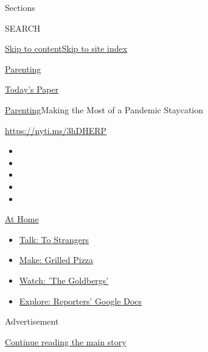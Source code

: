 Sections

SEARCH

\protect\hyperlink{site-content}{Skip to
content}\protect\hyperlink{site-index}{Skip to site index}

\href{https://www.nytimes.com/section/parenting}{Parenting}

\href{https://myaccount.nytimes.com/auth/login?response_type=cookie\&client_id=vi}{}

\href{https://www.nytimes.com/section/todayspaper}{Today's Paper}

\href{/section/parenting}{Parenting}\textbar{}Making the Most of a
Pandemic Staycation

\url{https://nyti.ms/3hDHERP}

\begin{itemize}
\item
\item
\item
\item
\item
\end{itemize}

\href{https://www.nytimes.com/spotlight/at-home?action=click\&pgtype=Article\&state=default\&region=TOP_BANNER\&context=at_home_menu}{At
Home}

\begin{itemize}
\tightlist
\item
  \href{https://www.nytimes.com/2020/08/03/well/family/the-benefits-of-talking-to-strangers.html?action=click\&pgtype=Article\&state=default\&region=TOP_BANNER\&context=at_home_menu}{Talk:
  To Strangers}
\item
  \href{https://www.nytimes.com/2020/08/01/at-home/coronavirus-make-pizza-on-a-grill.html?action=click\&pgtype=Article\&state=default\&region=TOP_BANNER\&context=at_home_menu}{Make:
  Grilled Pizza}
\item
  \href{https://www.nytimes.com/2020/07/31/arts/television/goldbergs-abc-stream.html?action=click\&pgtype=Article\&state=default\&region=TOP_BANNER\&context=at_home_menu}{Watch:
  'The Goldbergs'}
\item
  \href{https://www.nytimes.com/interactive/2020/at-home/even-more-reporters-editors-diaries-lists-recommendations.html?action=click\&pgtype=Article\&state=default\&region=TOP_BANNER\&context=at_home_menu}{Explore:
  Reporters' Google Docs}
\end{itemize}

Advertisement

\protect\hyperlink{after-top}{Continue reading the main story}

